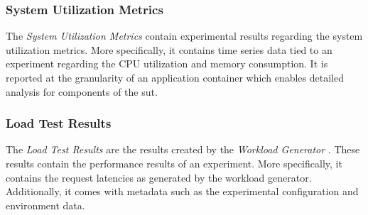 \subsubsection{System Utilization Metrics}
The \textit{System Utilization Metrics}  contain experimental results regarding the system utilization metrics. More specifically, it contains time series data tied to an experiment regarding the CPU utilization and memory consumption. It is reported at the granularity of an application container which enables detailed analysis for components of the \gls{sut}.

\subsubsection{Load Test Results}
The \textit{Load Test Results}  are the results created by the \textit{Workload Generator} . These results contain the performance results of an experiment. More specifically, it contains the request latencies as generated by the workload generator. Additionally, it comes with metadata  such as the experimental configuration and environment data. 
